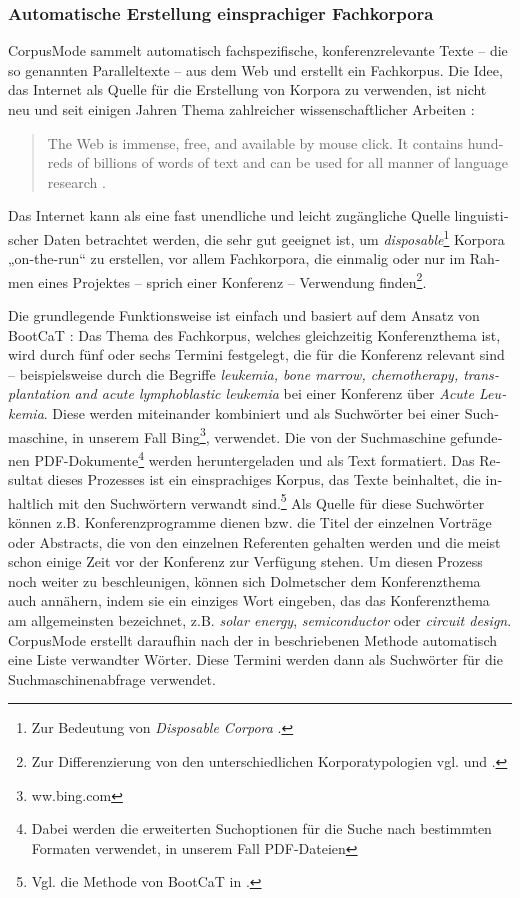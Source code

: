 \documentclass[output=paper]{LSP/langsci}
\begin{document}
\begin{otherlanguage}{ngerman}
\subsubsection{Automatische Erstellung einsprachiger Fachkorpora}\label{sec:fantinuoli:6.1.1}
\largerpage[-1]
CorpusMode sammelt automatisch fachspezifische, konferenzrelevante Texte -- die so genannten Paralleltexte -- aus dem Web und erstellt ein Fachkorpus. Die Idee, das Internet als Quelle für die Erstellung von Korpora zu verwenden, ist nicht neu und seit einigen Jahren Thema zahlreicher wissenschaftlicher Arbeiten \citep{Ghani2001,Baroni2004}: 

\begin{quote}
The Web is immense, free, and available by mouse click. It contains hundreds of billions of words of text and can be used for all manner of language research \citep[333]{Kilgarriff2003}.
\end{quote}

Das Internet kann als eine fast unendliche und leicht zugängliche Quelle linguistischer Daten betrachtet werden, die sehr gut geeignet ist, um \textit{disposable}\footnote{ Zur Bedeutung von \textit{Disposable Corpora}  \citet{Varantola2003}.} Korpora „on-the-run“ zu erstellen, vor allem Fachkorpora, die einmalig oder nur im Rahmen eines Projektes -- sprich einer Konferenz -- Verwendung finden\footnote{Zur Differenzierung von den unterschiedlichen Korporatypologien vgl. \citet{Hansen-Schirra2008} und \citet{Lemnitzer2010}.}.

Die grundlegende Funktionsweise ist einfach und basiert auf dem Ansatz von BootCaT \citep{Baroni2004}: Das Thema des Fachkorpus, welches gleichzeitig Konferenzthema ist, wird durch fünf oder sechs Termini festgelegt, die für die Konferenz relevant sind -- beispielsweise durch die Begriffe \textit{leukemia, bone marrow, chemotherapy, transplantation and acute lymphoblastic leukemia} bei einer Konferenz über \textit{Acute Leukemia}. Diese werden miteinander kombiniert und als Suchwörter bei einer Suchmaschine, in unserem Fall Bing\footnote{ ww.bing.com}, verwendet. Die von der Suchmaschine gefundenen PDF-Dokumente\footnote{Dabei werden die erweiterten Suchoptionen für die Suche nach bestimmten Formaten verwendet, in unserem Fall PDF-Dateien} werden heruntergeladen und als Text formatiert. Das Resultat dieses Prozesses ist ein einsprachiges Korpus, das Texte beinhaltet, die inhaltlich mit den Suchwörtern verwandt sind.\footnote{ Vgl. die Methode von BootCaT in \citet{Baroni2004}.} Als Quelle für diese Suchwörter können z.B. Konferenzprogramme dienen bzw. die Titel der einzelnen Vorträge oder Abstracts, die von den einzelnen Referenten gehalten werden und die meist schon einige Zeit vor der Konferenz zur Verfügung stehen. Um diesen Prozess noch weiter zu beschleunigen, können sich Dolmetscher dem Konferenzthema auch annähern, indem sie ein einziges Wort eingeben, das das Konferenzthema am allgemeinsten bezeichnet, z.B.\textit{ solar energy}, \textit{semiconductor} oder \textit{circuit design}. CorpusMode erstellt daraufhin nach der in  beschriebenen Methode automatisch eine Liste verwandter Wörter. Diese Termini werden dann als Suchwörter für die Suchmaschinenabfrage verwendet.


\end{otherlanguage}
\end{document}
